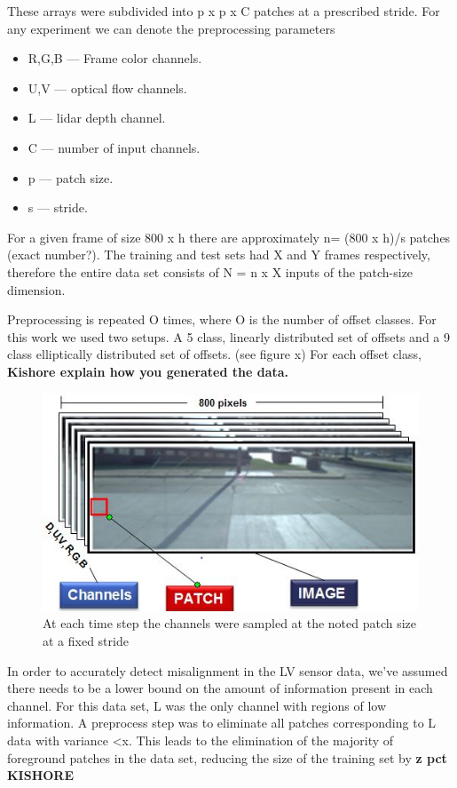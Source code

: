 \documentclass{article}
\begin{document}
These arrays were subdivided into p x p x C patches at a prescribed stride. For any experiment we can denote the preprocessing parameters 
\begin{itemize}
\item R,G,B --- Frame color channels.
\item U,V --- optical flow channels.
\item L --- lidar depth channel.
\item C --- number of input channels.
\item p --- patch size.
\item s --- stride.
\end{itemize}  

For a given frame of size 800 x h there are approximately n= (800 x h)/s patches (exact number?). The training and test sets had X and Y frames respectively, therefore the entire data set consists of  N = n x X inputs of the patch-size dimension. 

Preprocessing is repeated O times, where O is the number of offset classes. For this work we used two setups. A 5 class, linearly distributed set of offsets and a 9 class elliptically distributed set of offsets. (see figure x) For each offset class, \textbf{Kishore explain how you generated the data.} 

\begin{figure}[htbp]
        \includegraphics[scale=0.65]{Figures/ImagePatchChannel.jpg}
    \caption{At each time step the channels were sampled at the noted patch size at a fixed stride}
    \label{fig:ImageChStride}
\end{figure}

In order to accurately detect misalignment in the LV sensor data, we've assumed there needs to be a lower bound on the amount of information present in each channel. For this data set, L was the only channel with regions of low information. A preprocess step was to eliminate all patches corresponding to L data with variance <x. This leads to the elimination of the majority of foreground patches in the data set, reducing the size of the training set by \textbf{z pct KISHORE}
\end{document}
